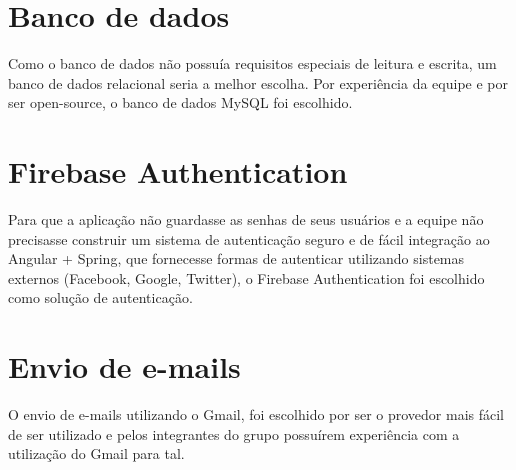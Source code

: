 \documentclass[
    12pt,               %
    openright,          %
    oneside,
    a4paper,            %
    english,            %
    brazil              %
    ]{ifsp-spo-inf-ctds} %
\begin{document}
\section{Banco de dados}
Como o banco de dados não possuía requisitos especiais de leitura e escrita, um banco de dados relacional seria a melhor escolha. Por experiência da equipe e por ser open-source, o banco de dados MySQL foi escolhido.

\section{Firebase Authentication}
Para que a aplicação não guardasse as senhas de seus usuários e a equipe não precisasse construir um sistema de autenticação seguro e de fácil integração ao Angular + Spring, que fornecesse formas de autenticar utilizando sistemas externos (Facebook, Google, Twitter), o Firebase Authentication foi escolhido como solução de autenticação.


\section{Envio de e-mails}
O envio de e-mails utilizando o Gmail, foi escolhido por ser o provedor mais fácil de ser utilizado e pelos integrantes do grupo possuírem experiência com a utilização do Gmail para tal.
\end{document}
